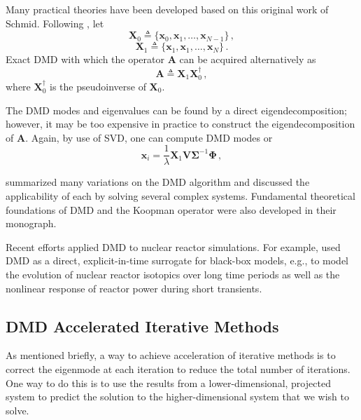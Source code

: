 Many practical theories have been developed based on this original work of Schmid.
Following \citet{tu_dynamic_2014}, let 
\begin{equation}
 \mathbf{X}_0 \triangleq \{\mathbf{x}_0, \mathbf{x}_1, \ldots, \mathbf{x}_{N-1} \}\, ,
 \label{eq:x1}
\end{equation}
\begin{equation}
 \mathbf{X}_1 \triangleq \{\mathbf{x}_1, \mathbf{x}_1, \ldots, \mathbf{x}_{N} \} \, .
 \label{eq:x2}
\end{equation}
Exact DMD with which the operator $\mathbf{A}$ can be acquired alternatively as   
\begin{equation}
 \mathbf{A}\triangleq \mathbf{X}_1  \mathbf{X}_0^{\dagger}\, ,
 \label{eq:exact_dmd}
\end{equation}
where $\mathbf{X}_0^{\dagger}$ is the pseudoinverse of $\mathbf{X}_0$. 

The DMD modes and eigenvalues can be found by a direct eigendecomposition; however, it may be too expensive in practice to construct the eigendecomposition of $\mathbf{A}$.
Again, by use of SVD, one can compute DMD modes  or
\begin{equation}
 \mathbf{\mathbf{x}}_i = \frac{1}{\lambda} \mathbf{X}_1 \mathbf{V} \mathbf{\Sigma}^{-1} \mathbf{\Phi} \, ,
 \label{eq:exact_dmd_free}
\end{equation}
 
\citet{kutz_dynamic_2016} summarized many variations on the DMD algorithm and discussed the applicability of each by solving several complex systems.
Fundamental theoretical foundations of DMD and the Koopman operator were also developed in their monograph.

Recent efforts applied DMD to nuclear reactor simulations. 
For example, \citet{abdo_data-driven_2018} used DMD as a direct, explicit-in-time surrogate for black-box models, e.g., to model the evolution of nuclear reactor isotopics over long time periods as well as the nonlinear response of reactor power during short transients.\cite{abdo_modeling_2019}\cite{elzohery2018comparison}

\subsection{DMD Accelerated Iterative Methods}
As mentioned briefly, a way to achieve acceleration of iterative methods is to correct the eigenmode at each iteration to reduce the total number of iterations.
One way to do this is to use the results from a lower-dimensional, projected system to predict the solution to the higher-dimensional system that we wish to solve.

